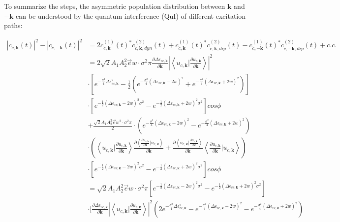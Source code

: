 To summarize the steps, the asymmetric population distribution between $\mathbf k$ and $\mathbf {-k}$  can be understood by the quantum interference (\gls{QuI}) of different excitation paths:

\begin{equation}
    \begin{aligned}
    |c_{c,\mathbf k}(t)|^2-|c_{c,-\mathbf k}(t)|^2&=
 2c^{(1)}_{c,\mathbf k}(t)^* c^{(2)}_{c,\mathbf k,dyn}(t) +c^{(1)}_{c,\mathbf k}(t)^* c^{(2)}_{c,\mathbf k,dip}(t)-c^{(1)}_{c,-\mathbf k}(t)^* c^{(2)}_{c,-\mathbf k,dip}(t) + c.c.\\
 &=2\sqrt{2} A_1 A_2^2 \vec e w \cdot \sigma^2 \pi \frac{\partial  \Delta \epsilon_{vc,\mathbf k}}{\partial \mathbf k} |\left \langle u_{c,\mathbf k}\Big |\frac{\partial u_{v,\mathbf k}}{\partial \mathbf k} \right \rangle|^2 \\
    &\cdot [e^{-\frac{\sigma^2}{4} \Delta \epsilon_{vc,\mathbf k} ^2}-\frac{1}{2}(e^{-\frac{\sigma^2}{4} (\Delta \epsilon_{vc,\mathbf k}-2w)^2}+e^{-\frac{\sigma^2}{4} (\Delta \epsilon_{vc,\mathbf k}+2w)^2})]\\
    &\cdot[e^{-\frac{1}2{}(\Delta \epsilon_{vc,\mathbf k} - 2w)^2 \sigma^2}
    -e^{-\frac{1}{2}(\Delta \epsilon_{vc,\mathbf k} + 2w)^2 \sigma^2} ]cos\phi\\
    &+\frac{\sqrt{2}A_1A_2^2 \vec e w^2 \cdot \sigma^2 \pi}{2}\cdot(e^{-\frac{\sigma^2}{4} (\Delta \epsilon_{vc,\mathbf k}-2w)^2}-e^{-\frac{\sigma^2}{4} (\Delta \epsilon_{vc,\mathbf k}+2w)^2})\\
    &\cdot (\left \langle u_{c,\mathbf k} \big | \frac{\partial u_{v,\mathbf k}}{\partial \mathbf k}  \right \rangle \frac{\partial{\left \langle\frac{\partial u_{v,\mathbf k}}{\partial \mathbf k}\Big |u_{c,\mathbf k}\right \rangle}}{\partial {\mathbf k}} +
   \frac{\partial{\left \langle u_{c,\mathbf k}\Big |\frac{\partial u_{v,\mathbf k}}{\partial \mathbf k} \right \rangle}}{\partial {\mathbf k}}
    \left \langle \frac{\partial u_{v,\mathbf k}}{\partial \mathbf k} |  u_{c,\mathbf k} \right \rangle)\\
    &\cdot[e^{-\frac{1}{2}(\Delta \epsilon_{vc,\mathbf k} - 2w)^2 \sigma^2}
    -e^{-\frac{1}{2}(\Delta \epsilon_{vc,\mathbf k} + 2w)^2 \sigma^2} ]cos\phi\\
    &=\sqrt{2} A_1 A_2^2 \vec e w \cdot \sigma^2 \pi [e^{-\frac{1}2{}(\Delta \epsilon_{vc,\mathbf k} - 2w)^2 \sigma^2}
    -e^{-\frac{1}{2}(\Delta \epsilon_{vc,\mathbf k} + 2w)^2 \sigma^2} ]\\
    &\cdot[\frac{\partial  \Delta \epsilon_{vc,\mathbf k}}{\partial \mathbf k} |\left \langle u_{c,\mathbf k}\Big |\frac{\partial u_{v,\mathbf k}}{\partial \mathbf k} \right \rangle|^2 (2e^{-\frac{\sigma^2}{4} \Delta \epsilon_{vc,\mathbf k} ^2}-e^{-\frac{\sigma^2}{4} (\Delta \epsilon_{vc,\mathbf k}-2w)^2}-e^{-\frac{\sigma^2}{4} (\Delta \epsilon_{vc,\mathbf k}+2w)^2})\\

\end{aligned}
\end{equation}
